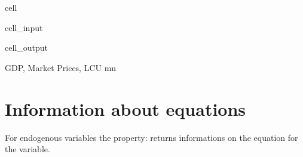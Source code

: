 \documentclass[letterpaper,10pt,english]{jupyterBook}
\begin{document}
\begin{sphinxuseclass}{cell}\begin{sphinxVerbatimInput}

\begin{sphinxuseclass}{cell_input}
\begin{sphinxVerbatim}[commandchars=\\\{\}]
\PYG{p}{[}\PYG{p}{]} 
\end{sphinxVerbatim}

\end{sphinxuseclass}\end{sphinxVerbatimInput}
\begin{sphinxVerbatimOutput}

\begin{sphinxuseclass}{cell_output}
\begin{sphinxVerbatim}[commandchars=\\\{\}]
\PYGZsq{}GDP, Market Prices, LCU mn\PYGZsq{}
\end{sphinxVerbatim}

\end{sphinxuseclass}\end{sphinxVerbatimOutput}

\end{sphinxuseclass}

\section{Information about equations}
\label{\detokenize{content/05_WBModels/LoadingWBModel:information-about-equations}}
\sphinxAtStartPar
For endogenous variables the property:  returns informations on the equation for the variable.
\end{document}
